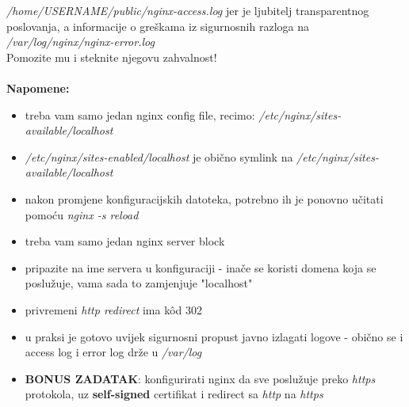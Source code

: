 \documentclass[12pt,a4paper]{article}
\begin{document}
\textit{/home/USERNAME/public/nginx-access.log} jer je ljubitelj transparentnog poslovanja,
a informacije o greškama iz sigurnosnih razloga na \textit{/var/log/nginx/nginx-error.log} \\
Pomozite mu i steknite njegovu zahvalnost!
\\
\\
\textbf{Napomene:}
\begin{itemize}
	\item treba vam samo jedan nginx config file, recimo: \textit{/etc/nginx/sites-available/localhost}
  \item \textit{/etc/nginx/sites-enabled/localhost} je obično symlink na \textit{/etc/nginx/sites-available/localhost}
  \item nakon promjene konfiguracijskih datoteka, potrebno ih je ponovno učitati pomoću \textit{nginx -s reload}
  \item treba vam samo jedan nginx server block
  \item pripazite na ime servera u konfiguraciji - inače se koristi domena koja se poslužuje, vama sada to zamjenjuje "localhost"
  \item privremeni \textit{http redirect} ima kôd 302
  \item u praksi je gotovo uvijek sigurnosni propust javno izlagati logove - obično se i access log i error log drže u \textit{/var/log}
  \item \textbf{BONUS ZADATAK}: konfigurirati nginx da sve poslužuje preko \textit{https} protokola, uz \textbf{self-signed} certifikat i redirect sa \textit{http} na \textit{https}
\end{itemize}
\end{document}
